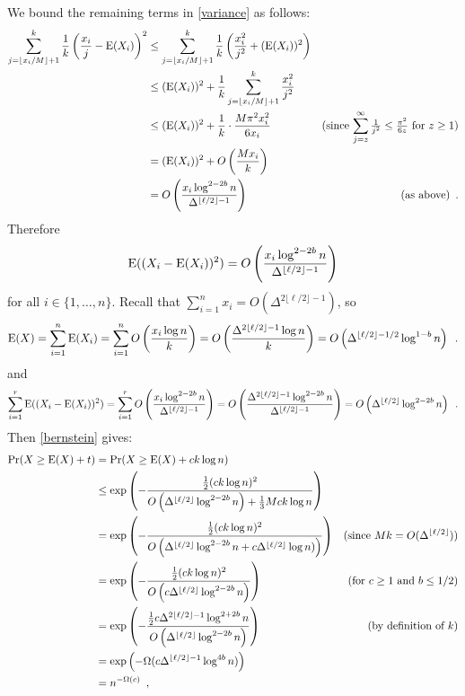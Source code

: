 \documentclass{patmorin}
\begin{document}
We bound the remaining terms in \cref{variance} as follows:
\begin{align*}
 \sum_{j=\lfloor x_i/M\rfloor+1}^k \frac{1}{k}\left(\frac{x_i}{j}-\mathrm{E}(X_i)\right)^2
  & \le \sum_{j=\lfloor x_i/M\rfloor+1}^k \frac{1}{k}\left(\frac{x_i^2}{j^2}+(\mathrm{E}(X_i))^2\right) \\
  & \le (\mathrm{E}(X_i))^2+\frac{1}{k}\sum_{j=\lfloor x_i/M\rfloor+1}^k \frac{x_i^2}{j^2} \\
  & \le (\mathrm{E}(X_i))^2 +  \frac{1}{k}\cdot\frac{M\pi^2x_i^2}{6 x_i}
  & \text{(since $\sum_{j=z}^{\infty} \tfrac{1}{j^2} \le \tfrac{\pi^2}{6z}$ for $z\ge 1$)} \\
  & = (\mathrm{E}(X_i))^2 + O\left(\frac{Mx_i}{k}\right) \\
  & = O\left(\frac{x_i\log^{2-2b} n}{\Delta^{\lfloor\ell/2\rfloor-1}}\right)
  & \text{(as above)} \enspace .
\end{align*}
Therefore
\[
  \mathrm{E}((X_i-\mathrm{E}(X_i))^2) = O\left(\frac{x_i\log^{2-2b} n}{\Delta^{\lfloor\ell/2\rfloor-1}}\right)
\]
for all $i\in\{1,\ldots,n\}$.  Recall that $\sum_{i=1}^n x_i = O(\Delta^{2\lfloor\ell/2\rfloor-1})$, so
\[
  \mathrm{E}(X)
  = \sum_{i=1}^n \mathrm{E}(X_i)
  = \sum_{i=1}^n O\left(\frac{x_i\log n}{k}\right)
  = O\left(\frac{\Delta^{2\lfloor\ell/2\rfloor-1}\log n}{k}\right)
  = O\left(\Delta^{\lfloor\ell/2\rfloor-1/2}\log^{1-b} n\right) \enspace .
\]
and
\[
  \sum_{i=1}^r\mathrm{E}((X_i-\mathrm{E}(X_i))^2)
  = \sum_{i=1}^r O\left(\frac{x_i\log^{2-2b} n}{\Delta^{\lfloor\ell/2\rfloor-1}}\right)
  = O\left(\frac{\Delta^{2\lfloor\ell/2\rfloor-1}\log^{2-2b} n}{\Delta^{\lfloor\ell/2\rfloor-1}}\right)
  = O\left(\Delta^{\lfloor\ell/2\rfloor}\log^{2-2b} n\right)
  \enspace .
\]
Then \cref{bernstein} gives:
\begin{align*}
  \Pr(X\ge \mathrm{E}(X)+t)
  & = \Pr(X\ge \mathrm{E}(X)+ck\log n) \\
  & \le \exp \left(-\frac{\tfrac{1}{2}(ck\log n)^2}{O\left(\Delta^{\lfloor\ell/2\rfloor}\log^{2-2b} n\right) + \tfrac{1}{3}Mck\log n}\right) \\
  & = \exp \left(-\frac{\tfrac{1}{2}(ck\log n)^2}{O\left(\Delta^{\lfloor\ell/2\rfloor}\log^{2-2b} n +c\Delta^{\lfloor\ell/2\rfloor}\log n)\right)}\right)
    & \text{(since $Mk=O(\Delta^{\lfloor\ell/2\rfloor})$)} \\
  & = \exp \left(-\frac{\tfrac{1}{2}(ck\log n)^2}{O\left(c\Delta^{\lfloor\ell/2\rfloor}\log^{2-2b} n\right)}\right) & (\text{for $c\ge 1$ and $b\le 1/2$}) \\
  & = \exp \left(-\frac{\tfrac{1}{2}c\Delta^{2\lfloor\ell/2\rfloor-1}\log^{2+2b} n}{O\left(\Delta^{\lfloor\ell/2\rfloor}\log^{2-2b} n\right)}\right) & \text{(by definition of $k$)}\\
  & = \exp\left(-\Omega(c\Delta^{\lfloor\ell/2\rfloor-1}\log^{4b} n)\right) \\
  & = n^{-\Omega(c)} \enspace ,
\end{align*}
\end{document}
